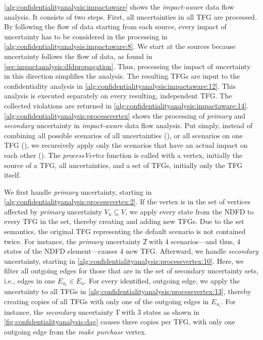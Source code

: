 \autoref{alg:confidentialityanalysis:impactaware} shows the \emph{impact-aware} data flow analysis.
It consists of two steps.
First, all uncertainties in all \ac{TFG} are processed.
By following the flow of data starting from each source, every impact of uncertainty has to be considered in the processing in \autoref{alg:confidentialityanalysis:impactaware:8}.
We start at the sources because uncertainty follows the flow of data, as found in \autoref{sec:impactanalysis:dfdpropagation}.
Thus, processing the impact of uncertainty in this direction simplifies the analysis.
The resulting \acp{TFG} are input to the confidentiality analysis in \autoref{alg:confidentialityanalysis:impactaware:12}.
This analysis is executed separately on every resulting, independent \ac{TFG}.
The collected violations are returned in \autoref{alg:confidentialityanalysis:impactaware:14}.
\autoref{alg:confidentialityanalysis:processvertex} shows the processing of \emph{primary} and \emph{secondary} uncertainty in \emph{impact-aware} data flow analysis.
Put simply, instead of combining all possible scenarios of all uncertainties (), or all scenarios on one \ac{TFG} (), we recursively apply only the scenarios that have an actual impact on each other ().
The \emph{processVertex} function is called with a vertex, initially the source of a \ac{TFG}, all uncertainties, and a set of \acp{TFG}, initially only the \ac{TFG} itself.

We first handle \emph{primary} uncertainty, starting in \autoref{alg:confidentialityanalysis:processvertex:2}.
If the vertex is in the set of vertices affected by \emph{primary} uncertainty $V_{u} \subseteq V$, we apply every state from the \ac{NDFD} to every \ac{TFG} in the set, thereby creating and adding new \acp{TFG}.
Due to the set semantics, the original \ac{TFG} representing the default scenario is not contained twice.
For instance, the \emph{primary} uncertainty \U{2} with 4 scenarios---and thus, 4 states of the \ac{NDFD} element---causes 4 new \ac{TFG}.
Afterward, we handle \emph{secondary} uncertainty, starting in \autoref{alg:confidentialityanalysis:processvertex:10}.
Here, we filter all outgoing edges for those that are in the set of secondary uncertainty sets, i.e., edges in one $E_{u_{i}} \in E_{u}$.
For every identified, outgoing edge, we apply the uncertainty to all \acp{TFG} in \autoref{alg:confidentialityanalysis:processvertex:13}, thereby creating copies of all \acp{TFG} with only one of the outgoing edges in $E_{u_{i}}$.
For instance, the \emph{secondary} uncertainty \U{1} with 3 states as shown in \autoref{fig:confidentialityanalysis:dag} causes three copies per \ac{TFG}, with only one outgoing edge from the \emph{make purchase} vertex.

